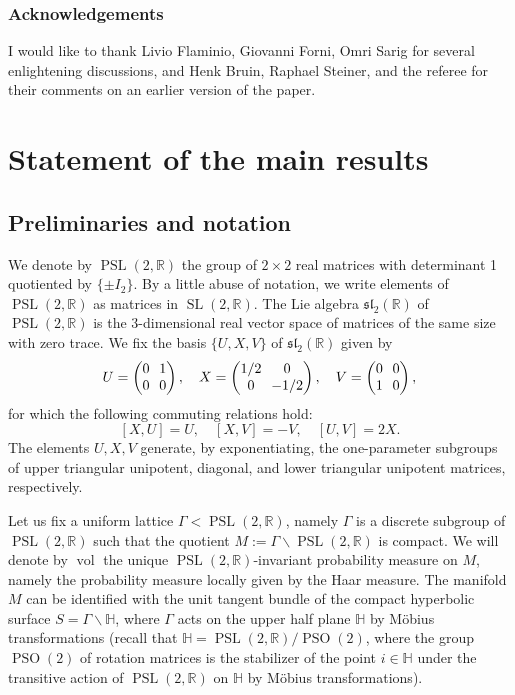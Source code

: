 \documentclass[10pt]{amsart}
\newcommand \R{\mathbb{R}}
\newcommand \Hbb{\mathbb{H}}
\DeclareMathOperator{\SL}{SL}
\DeclareMathOperator{\PSL}{PSL}
\DeclareMathOperator{\PSO}{PSO}
\DeclareMathOperator{\vol}{vol}
\theoremstyle{definition}
\begin{document}
\subsubsection*{Acknowledgements}
I would like to thank Livio Flaminio, Giovanni Forni, Omri Sarig for several enlightening discussions, and Henk Bruin, Raphael Steiner, and the referee for their comments on an earlier version of the paper.

\section{Statement of the main results}\label{sec:statement}

\subsection{Preliminaries and notation}

We denote by $\PSL(2,\R)$ the group of $2 \times 2$ real matrices with determinant 1 quotiented by $\{\pm I_2\}$.
By a little abuse of notation, we write elements of $\PSL(2,\R)$ as matrices in $\SL(2,\R)$.
The Lie algebra $\mathfrak{sl}_2(\R)$ of $\PSL(2,\R)$ is the 3-dimensional real vector space of matrices of the same size with zero trace.
We fix the basis $\{ U,X,V \}$ of $\mathfrak{sl}_2(\R)$ given by\vspace*{-3pt}
\[\arraycolsep3.5pt
U =
\begin{pmatrix}
0 & 1 \\
0 & 0
\end{pmatrix},
\ \ \
X =
\begin{pmatrix}
1/2 & 0 \\
0 & -1/2
\end{pmatrix},
\ \ \
V =
\begin{pmatrix}
0 & 0 \\
1 & 0
\end{pmatrix},
\]
for which the following commuting relations hold:\vspace*{-3pt}
\[
[X,U] = U, \quad [X,V] = -V, \quad [U,V]= 2X.
\]
The elements $U, X, V$ generate, by exponentiating, the one-parameter subgroups of upper triangular unipotent, diagonal, and lower triangular unipotent matrices, respectively.

Let us fix a uniform lattice $\Gamma < \PSL(2,\R)$, namely $\Gamma$ is a discrete subgroup of $\PSL(2,\R)$ such that the quotient $M := \Gamma \backslash \PSL(2,\R)$ is compact.
We will denote by $\vol$ the unique $\PSL(2,\R)$-invariant probability measure on $M$, namely the probability measure locally given by the Haar measure.
The manifold $M$ can be identified with the unit tangent bundle of the compact hyperbolic surface $S = \Gamma \backslash \Hbb$, where $\Gamma$ acts on the upper half plane $\Hbb$ by Möbius transformations (recall that $\Hbb = \PSL(2,\R) / \PSO(2)$, where the group $\PSO(2)$ of rotation matrices is the stabilizer of the point $i \in \Hbb$ under the transitive action of $\PSL(2,\R)$ on $\Hbb$ by Möbius transformations).
\end{document}
